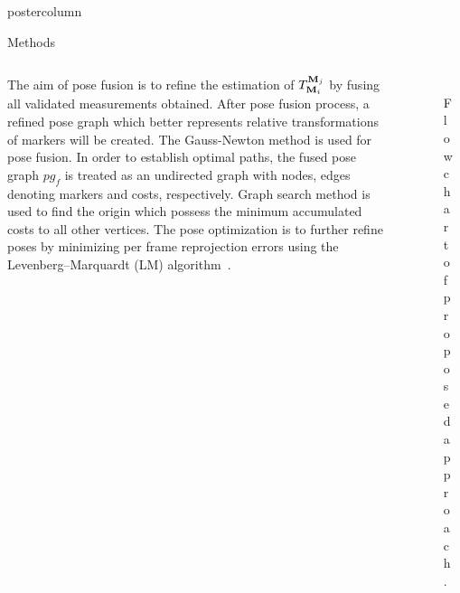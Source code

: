 \documentclass{beamer}
\begin{document}
\begin{frame}
\begin{columns}
\begin{column}{.57\textwidth}
\begin{beamercolorbox}[center]{postercolumn}
\begin{minipage}{.98\textwidth}
{\begin{myblock}{Methods}
\begin{minipage}[0.3\textheight]{\textwidth}
\begin{columns}[T]
\begin{column}{0.5\textwidth}
The aim of pose fusion is to refine the estimation of  ${{T}_{\bold{M}_i}^{\bold{M}_j}}$ by fusing all validated measurements obtained. After pose fusion process, a refined pose graph which better represents relative transformations of markers will be created. The Gauss-Newton method is used for pose fusion.
%
In order to establish optimal paths, the fused pose graph $pg_f$ is treated as an undirected graph with nodes, edges denoting markers and costs, respectively. Graph search method is used to find the origin which possess the minimum accumulated costs to all other vertices. The pose optimization is to further refine poses by minimizing per frame reprojection errors using the Levenberg–Marquardt (LM) algorithm~\cite{madsen1999methods}.
\end{column}
\begin{column}{0.5\textwidth}
\begin{figure}
\includegraphics[width=0.72\textwidth]{img/flow.png}
\caption{Flowchart of proposed approach.}
\label{fig:flowchart}
\end{figure}
\begin{figure}
\includegraphics[width=0.72\textwidth]{img/ds.png}

\end{figure}
\end{column}
\end{columns}
\end{minipage}
\end{myblock}}
\end{minipage}
\end{beamercolorbox}
\end{column}
\end{columns}
\end{frame}
\end{document}
